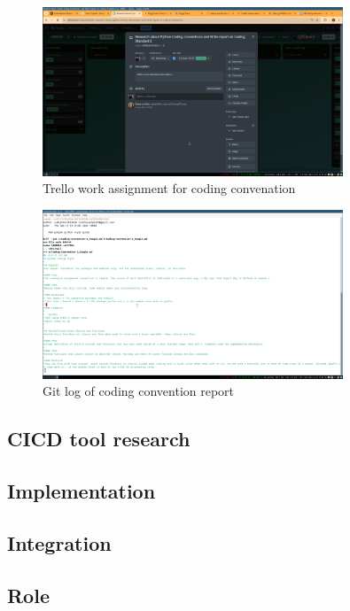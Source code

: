 \documentclass[a4paper,12pt]{article}
\begin{document}
\begin{figure}[H]
    \centering
    \includegraphics[width=0.8\textwidth]{images/trello_coding_convention.png}
    \caption{Trello work assignment for coding convenation}
    \label{fig:trellocodingconventionreport}
\end{figure}


\begin{figure}[H]
    \centering
    \includegraphics[width=0.8\textwidth]{images/git_coding_convention.png}
    \caption{Git log of coding convention report}
    \label{fig:gitcodingconvention}
\end{figure}


\subsection{CICD tool research}
\subsection{Implementation}
\subsection{Integration}
\subsection{Role}
\end{document}
